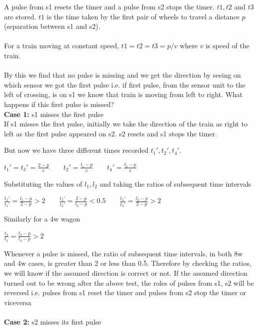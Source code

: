 \documentclass[aps,letterpaper,11pt]{article}
\begin{document}
A pulse from s1 resets the timer and a pulse from s2 stops the timer. $t1, t2
$ and $t3$  are stored. $t1$ is
the time taken by the first pair of wheels to travel a distance $p$(separation
between s1 and s2). \\ \\
For a train moving at constant speed, $t1 = t2 = t3 = p/v$ where $v$ is speed
of the train. \\ \\
By this we find that no pulse is missing and we get the direction by seeing on
which sensor we got the first pulse i.e. if first pulse, from the sensor unit
to the left of crossing, is on s1 we know that train is moving from left to
right. What happens if this first pulse is missed? \\

\textbf{Case 1:} s1 misses the first pulse \\
If s1 misses the first pulse, initially we take the direction of the train as
right to left as the first pulse appeared on s2. s2 resets and s1 stops the
timer.


But now we have three different times recorded $t_1', t_2', t_4'$.
\begin{center}
$
t_1' = t_3' =\frac{2-p}{v} \qquad
t_2' = \frac{l_1-p}{v} \qquad
t_4' = \frac{l_2-p}{v}
$
\end{center}
Substituting the values of $l_1, l_2$ and taking the ratios of subsequent time
intervals
\begin{center}
$
\frac{t_2'}{t_1'} = \frac{l_1-p}{2-p} > 2 \qquad
\frac{t_3'}{t_2'} = \frac{2-p}{l_2-p} < 0.5 \qquad \frac{t_4'}{t_3'} = \frac{l_2-p}{2-p} > 2 $
\end{center}
\mbox{}
Similarly for a 4w wagon

\begin{center}$\frac{t_2}{t_1} = \frac{l_3-p}{l_4-p} > 2 $ \end{center}
Whenever a pulse is missed, the ratio of subsequent time intervals, in both 8w and 4w cases, is greater than 2 or less than 0.5. Therefore by checking the ratios, we will know if the assumed direction is correct or not. If the assumed direction turned out to be wrong after the above test, the roles of pulses from s1, s2 will be reversed i.e. pulses from s1 reset the timer and pulses from s2 stop the timer or viceversa \\ \\

\textbf{Case 2:} s2 misses its first pulse \\
\end{document}
